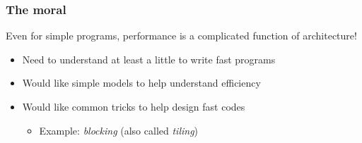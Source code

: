 \documentclass{beamer}
\begin{document}
\begin{frame}
  \frametitle{The moral}
  
  Even for simple programs, performance is a complicated function of
  architecture!
  \begin{itemize}
  \item Need to understand at least a little to write fast programs
  \item Would like simple models to help understand efficiency
  \item Would like common tricks to help design fast codes
    \begin{itemize}
    \item Example: {\em blocking} (also called {\em tiling})
    \end{itemize}
  \end{itemize}
\end{frame}
\end{document}
